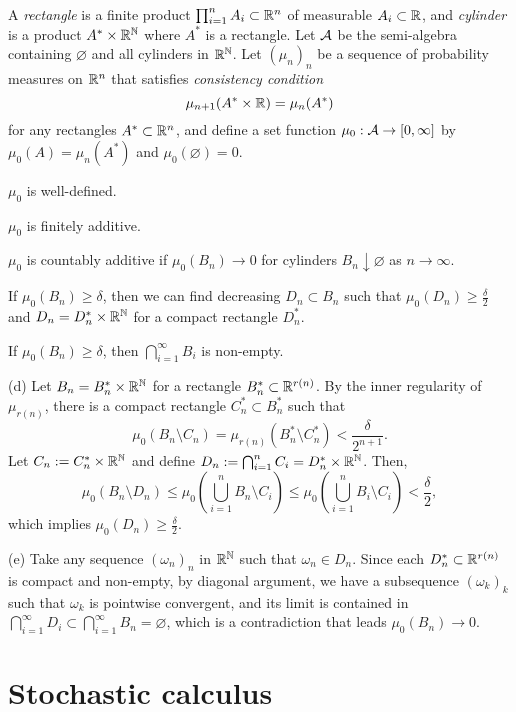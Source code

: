 \documentclass{../note}
\begin{document}
\begin{prb}
A \emph{rectangle} is a finite product $\prod_{i=1}^nA_i\subset\mathbb{R}^n$ of measurable $A_i\subset\mathbb{R}$, and \emph{cylinder} is a product $A^*\times\mathbb{R}^{\mathbb{N}}$ where $A^*$ is a rectangle.
Let $\mathcal{A}$ be the semi-algebra containing $\varnothing$ and all cylinders in $\mathbb{R}^{\mathbb{N}}$.
Let $(\mu_n)_n$ be a sequence of probability measures on $\mathbb{R}^n$ that satisfies \emph{consistency condition}
\[\mu_{n+1}(A^*\times\mathbb{R})=\mu_n(A^*)\]
for any rectangles $A^*\subset\mathbb{R}^n$, and define a set function $\mu_0:\mathcal{A}\to[0,\infty]$ by $\mu_0(A)=\mu_n(A^*)$ and $\mu_0(\varnothing)=0$.
\begin{parts}
\item $\mu_0$ is well-defined.
\item $\mu_0$ is finitely additive.
\item $\mu_0$ is countably additive if $\mu_0(B_n)\to0$ for cylinders $B_n\downarrow\varnothing$ as $n\to\infty$.
\item If $\mu_0(B_n)\ge\delta$, then we can find decreasing $D_n\subset B_n$ such that $\mu_0(D_n)\ge\frac\delta2$ and $D_n=D_n^*\times\mathbb{R}^{\mathbb{N}}$ for a compact rectangle $D_n^*$.
\item If $\mu_0(B_n)\ge\delta$, then $\bigcap_{i=1}^\infty B_i$ is non-empty.
\end{parts}
\end{prb}
\begin{pf}
(d)
Let $B_n=B_n^*\times\mathbb{R}^{\mathbb{N}}$ for a rectangle $B_n^*\subset\mathbb{R}^{r(n)}$.
By the inner regularity of $\mu_{r(n)}$, there is a compact rectangle $C_n^*\subset B_n^*$ such that
\[\mu_0(B_n\setminus C_n)=\mu_{r(n)}(B_n^*\setminus C_n^*)<\frac\delta{2^{n+1}}.\]
Let $C_n:=C_n^*\times\mathbb{R}^{\mathbb{N}}$ and define $D_n:=\bigcap_{i=1}^nC_i=D_n^*\times\mathbb{R}^{\mathbb{N}}$.
Then,
\[\mu_0(B_n\setminus D_n)\le\mu_0(\bigcup_{i=1}^nB_n\setminus C_i)\le\mu_0(\bigcup_{i=1}^nB_i\setminus C_i)<\frac\delta2,\]
which implies $\mu_0(D_n)\ge\frac\delta2$.

(e)
Take any sequence $(\omega_n)_n$ in $\mathbb{R}^{\mathbb{N}}$ such that $\omega_n\in D_n$.
Since each $D_n^*\subset\mathbb{R}^{r(n)}$ is compact and non-empty, by diagonal argument, we have a subsequence $(\omega_k)_k$ such that $\omega_k$ is pointwise convergent, and its limit is contained in $\bigcap_{i=1}^\infty D_i\subset\bigcap_{i=1}^\infty B_n=\varnothing$, which is a contradiction that leads $\mu_0(B_n)\to0$.
\end{pf}




\part{Stochastic calculus}
\end{document}
